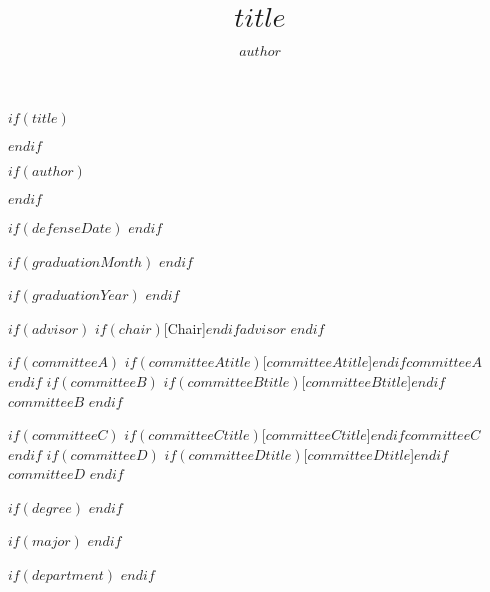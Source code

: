 

$if(title)$
\title{$title$}
$endif$

$if(author)$
\author{$author$}
$endif$

$if(defenseDate)$
$endif$

$if(graduationMonth)$
$endif$

$if(graduationYear)$
$endif$

%
%
$if(advisor)$
\advisor$if(chair)$[Chair]$endif${$advisor$}
$endif$

$if(committeeA)$
\committeeA$if(committeeAtitle)$[$committeeAtitle$]$endif${$committeeA$}
$endif$
$if(committeeB)$
\committeeB$if(committeeBtitle)$[$committeeBtitle$]$endif${$committeeB$}
$endif$

$if(committeeC)$
\committeeC$if(committeeCtitle)$[$committeeCtitle$]$endif${$committeeC$}
$endif$
$if(committeeD)$
\committeeD$if(committeeDtitle)$[$committeeDtitle$]$endif${$committeeD$}
$endif$

$if(degree)$
$endif$

$if(major)$
$endif$

$if(department)$
$endif$


